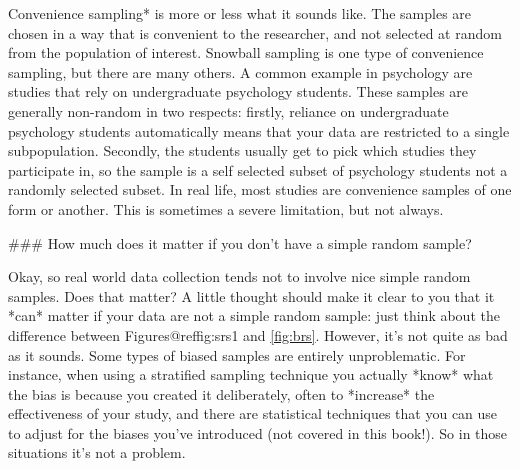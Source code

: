 \item *Convenience sampling* is more or less what it sounds like. The samples are chosen in a way that is convenient to the researcher, and not selected at random from the population of interest. Snowball sampling is one type of convenience sampling, but there are many others. A common example in psychology are studies that rely on undergraduate psychology students. These samples are generally non-random in two respects: firstly, reliance on undergraduate psychology students automatically means that your data are restricted to a single subpopulation. Secondly, the students usually get to pick which studies they participate in, so the sample is a self selected subset of psychology students not a randomly selected subset. In real life, most studies are convenience samples of one form or another. This is sometimes a severe limitation, but not always.


### How much does it matter if you don't have a simple random sample?

Okay, so real world data collection tends not to involve nice simple random samples. Does that matter? A little thought should make it clear to you that it *can* matter if your data are not a simple random sample: just think about the difference between Figures@reffig:srs1 and \ref{fig:brs}. However, it's not quite as bad as it sounds. Some types of biased samples are entirely unproblematic. For instance, when using a stratified sampling technique you actually *know* what the bias is because you created it deliberately, often to *increase* the effectiveness of your study, and there are statistical techniques that you can use to adjust for the biases you've introduced (not covered in this book!). So in those situations it's not a problem. 

